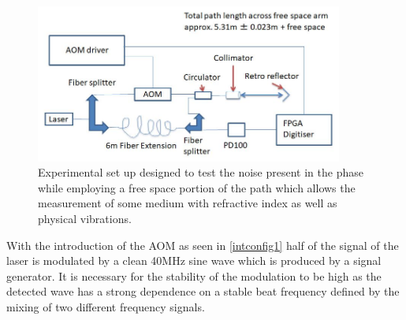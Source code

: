 \documentclass[12pt,a4paper,oneside]{report}
\begin{document}
\begin{figure}[H] 
\includegraphics[width=0.9\textwidth, center,angle=0]{DImages/intconfig2.JPG}
\caption{Experimental set up designed to test the noise present in the phase while employing a free space portion of the path which allows the measurement of some medium with refractive index as well as physical vibrations.}
\label{intconfig2}
\end{figure}

With the introduction of the AOM \cite{Sell1550MODULATORb} as seen in \autoref{intconfig1} half of the signal of the laser is modulated by a clean 40MHz sine wave which is produced by a signal generator. It is necessary for the stability of the modulation to be high as the detected wave has a strong dependence on a stable beat frequency defined by the mixing of two different frequency signals.
\end{document}

